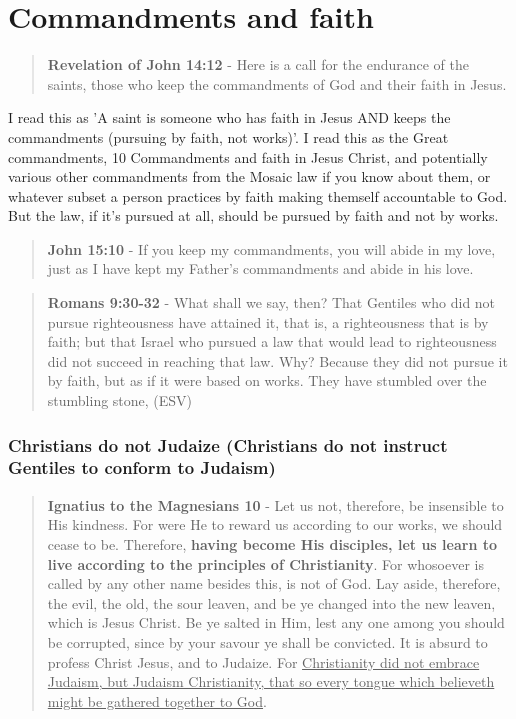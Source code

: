 \documentclass[11pt]{article}
\begin{document}
\section{Commandments and faith}
\label{sec:org6ee8039}
\begin{quote}
\textbf{Revelation of John 14:12} - Here is a call for the endurance of the saints, those who keep the commandments of God and their faith in Jesus.
\end{quote}

I read this as 'A saint is someone who has faith in Jesus AND keeps the commandments (pursuing by faith, not works)'.
I read this as the Great commandments, 10 Commandments and faith in Jesus Christ, and potentially various other commandments from the Mosaic law if you know about them, or whatever subset a person practices by faith making themself accountable to God.
But the law, if it's pursued at all, should be pursued by faith and not by works.

\begin{quote}
\textbf{John 15:10} - If you keep my commandments, you will abide in my love, just as I have kept my Father's commandments and abide in his love.
\end{quote}

\begin{quote}
\textbf{Romans 9:30-32} - What shall we say, then? That Gentiles who did not pursue righteousness have attained it, that is, a righteousness that is by faith; but that Israel who pursued a law that would lead to righteousness did not succeed in reaching that law. Why? Because they did not pursue it by faith, but as if it were based on works. They have stumbled over the stumbling stone, (ESV)
\end{quote}

\subsubsection{Christians do not Judaize (Christians do not instruct Gentiles to conform to Judaism)}
\label{sec:org260f113}
\begin{quote}
\textbf{Ignatius to the Magnesians 10} - Let us not, therefore, be insensible to His kindness. For were He to reward us according to our works, we should cease to be. Therefore, \textbf{having become His disciples, let us learn to live according to the principles of Christianity}. For whosoever is called by any other name besides this, is not of God. Lay aside, therefore, the evil, the old, the sour leaven, and be ye changed into the new leaven, which is Jesus Christ. Be ye salted in Him, lest any one among you should be corrupted, since by your savour ye shall be convicted. It is absurd to profess Christ Jesus, and to Judaize. For \uline{Christianity did not embrace Judaism, but Judaism Christianity, that so every tongue which believeth might be gathered together to God}.
\end{quote}
\end{document}
